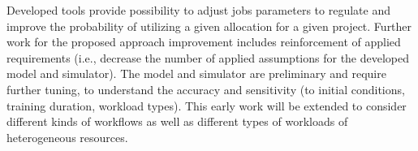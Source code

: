 Developed tools provide possibility to adjust jobs parameters to regulate and improve the probability of utilizing a given allocation for a given project. Further work for the proposed approach improvement includes reinforcement of applied requirements (i.e., decrease the number of applied assumptions for the developed model and simulator). The model and simulator are preliminary and require further tuning, to understand the accuracy and sensitivity (to initial conditions, training duration, workload types). This early work will be extended to consider different kinds of workflows as well as different types of workloads of heterogeneous resources.
